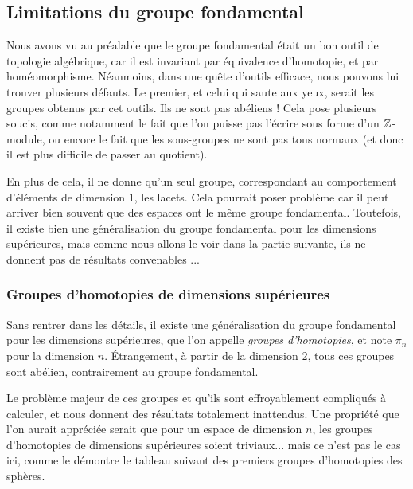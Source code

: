\subsection{Limitations du groupe fondamental}

Nous avons vu au préalable que le groupe fondamental était un bon outil de topologie algébrique, car il est invariant par équivalence d'homotopie, et par homéomorphisme. Néanmoins, dans une quête d'outils efficace, nous pouvons lui trouver plusieurs défauts. Le premier, et celui qui saute aux yeux, serait les groupes obtenus par cet outils. Ils ne sont pas abéliens ! Cela pose plusieurs soucis, comme notamment le fait que l'on puisse pas l'écrire sous forme d'un $\mathbb{Z}$-module, ou encore le fait que les sous-groupes ne sont pas tous normaux (et donc il est plus difficile de passer au quotient).

En plus de cela, il ne donne qu'un seul groupe, correspondant au comportement d'éléments de dimension 1, les lacets. Cela pourrait poser problème car il peut arriver bien souvent que des espaces ont le même groupe fondamental. Toutefois, il existe bien une généralisation du groupe fondamental pour les dimensions supérieures, mais comme nous allons le voir dans la partie suivante, ils ne donnent pas de résultats convenables ...

\subsubsection{Groupes d'homotopies de dimensions supérieures}

Sans rentrer dans les détails, il existe une généralisation du groupe fondamental pour les dimensions supérieures, que l'on appelle \emph{groupes d'homotopies}, et note $\pi_n$ pour la dimension $n$. Étrangement, à partir de la dimension 2, tous ces groupes sont abélien, contrairement au groupe fondamental.

Le problème majeur de ces groupes et qu'ils sont effroyablement compliqués à calculer, et nous donnent des résultats totalement inattendus. Une propriété que l'on aurait appréciée serait que pour un espace de dimension $n$, les groupes d'homotopies de dimensions supérieures soient triviaux... mais ce n'est pas le cas ici, comme le démontre le tableau suivant des premiers groupes d'homotopies des sphères.

